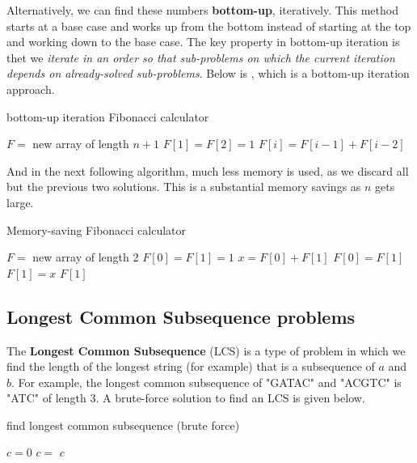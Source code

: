 \documentclass[titlepage, 12pt, leqno]{article}
\begin{document}
Alternatively, we can find these numbers \textbf{bottom-up}, iteratively. This
method starts at a base case and works up from the bottom instead of starting at
the top and working down to the base case. The key property in bottom-up 
iteration is thet we \textit{iterate in an order so that sub-problems on which
the current iteration depends on already-solved sub-problems}. Below is 
, which is a bottom-up iteration approach.

\begin{algorithm}
\caption{bottom-up iteration Fibonacci calculator}
\begin{algorithmic}[1]
    \State $F = $ new array of length $n+1$
    \State $F[1] = F[2] = 1$
        \State $F[i] = F[i-1] + F[i-2]$
    \EndFor
\EndProcedure 
\end{algorithmic}
\end{algorithm}

And in the next following  algorithm, much less memory is used,
as we discard all but the previous two solutions. This is a substantial memory
savings as $n$ gets large.

\begin{algorithm}
\caption{Memory-saving Fibonacci calculator}
\begin{algorithmic}[1]
    \State $F = $ new array of length 2
    \State $F[0] = F[1] = 1$
        \State $x = F[0] + F[1]$
        \State $F[0] = F[1]$
        \State $F[1] = x$
    \EndFor
    \State \Return $F[1]$
\EndProcedure 
\end{algorithmic}
\end{algorithm}

\subsection{Longest Common Subsequence problems}
The \textbf{Longest Common Subsequence} (LCS) is a type of problem in which we
find the length of the longest string (for example) that is a subsequence of
$a$ and $b$. For example, the longest common subsequence of "GATAC" and "ACGTC"
is "ATC" of length 3. A brute-force solution to find an LCS is given below.

\begin{algorithm}
\caption{find longest common subsequence (brute force)}
\begin{algorithmic}[1]
    \State $c=0$
            \State $c =$ 
        \EndIf
    \EndFor
    \State \Return $c$
\EndProcedure 
\end{algorithmic}
\end{algorithm}
\end{document}
